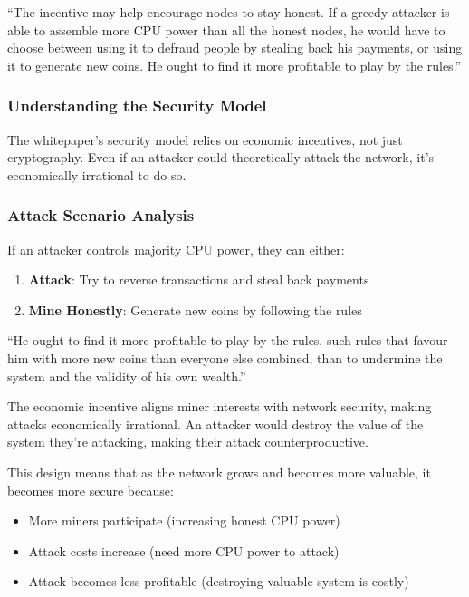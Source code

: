 ``The incentive may help encourage nodes to stay honest. If a greedy attacker is able to assemble more CPU power than all the honest nodes, he would have to choose between using it to defraud people by stealing back his payments, or using it to generate new coins. He ought to find it more profitable to play by the rules.''

\subsubsection{Understanding the Security Model}

The whitepaper's security model relies on economic incentives, not just cryptography. Even if an attacker could theoretically attack the network, it's economically irrational to do so.

\subsubsection{Attack Scenario Analysis}

If an attacker controls majority CPU power, they can either:
\begin{enumerate}
  \item \textbf{Attack}: Try to reverse transactions and steal back payments
  \item \textbf{Mine Honestly}: Generate new coins by following the rules
\end{enumerate}

``He ought to find it more profitable to play by the rules, such rules that favour him with more new coins than everyone else combined, than to undermine the system and the validity of his own wealth.''

The economic incentive aligns miner interests with network security, making attacks economically irrational. An attacker would destroy the value of the system they're attacking, making their attack counterproductive.

This design means that as the network grows and becomes more valuable, it becomes more secure because:
\begin{itemize}
  \item More miners participate (increasing honest CPU power)
  \item Attack costs increase (need more CPU power to attack)
  \item Attack becomes less profitable (destroying valuable system is costly)
\end{itemize}


